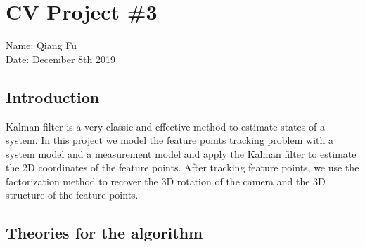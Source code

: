 \documentclass{article}
\begin{document}
\section*{CV Project \#3}
Name: Qiang Fu
\\Date: December 8th 2019

\subsection*{Introduction} 
Kalman filter is a very classic and effective method to estimate states of a system. In this project we model the feature points tracking problem with a system model and a measurement model and apply the Kalman filter to estimate the 2D coordinates of the feature points. After tracking feature points, we use the factorization method to recover the 3D rotation of the camera and the 3D structure of the feature points.
\subsection*{Theories for the algorithm}
\end{document}
